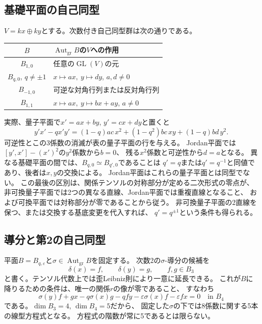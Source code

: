 \documentclass[11pt,a4paper]{ltjsarticle}
\theoremstyle{definition}
\newcommand{\Aut}{\operatorname{Aut}}
\newcommand{\GL}{\operatorname{GL}}
\begin{document}
\subsection{基礎平面の自己同型}
$V=kx\oplus ky$とする。次数付き自己同型群は次の通りである。
\begin{center}
\begin{tabular}{c|p{.65\linewidth}}
\toprule
$B$ & $\Aut_{\mathrm{gr}}B$の$V$への作用\\
\midrule
$B_{1,0}$ & 任意の$\GL(V)$の元\\
$B_{q,0}$, $q\ne\pm1$ & $x\mapsto ax,\ y\mapsto dy$, $a,d\ne0$\\
$B_{-1,0}$ & 可逆な対角行列または反対角行列\\
$B_{1,1}$ & $x\mapsto ax,\ y\mapsto bx+ay$, $a\ne0$\\
\bottomrule
\end{tabular}
\end{center}
実際、量子平面で$x'=ax+by$, $y'=cx+dy$と置くと
\[
y'x'-qx'y'=(1-q)ac\,x^2+(1-q^2)bc\,xy+(1-q)bd\,y^2.
\]
可逆性とこの3係数の消滅が表の量子平面の行を与える。
Jordan平面では$[y',x']-(x')^2$の$y^2$係数から$b=0$、
残る$x^2$係数と可逆性から$d=a$となる。
異なる基礎平面の間では、$B_{q,0}\simeq B_{q',0}$であることは
$q'=q$または$q'=q^{-1}$と同値であり、後者は$x,y$の交換による。
Jordan平面はこれらの量子平面とは同型でない。
この最後の区別は、関係テンソルの対称部分が定める二次形式の零点が、
非可換量子平面では2つの異なる直線、Jordan平面では重複直線となること、
および可換平面では対称部分が零であることから従う。
非可換量子平面の2直線を保つ、または交換する基底変更を代入すれば、
$q'=q^{\pm1}$という条件も得られる。

\subsection{導分と第2の自己同型}
平面$B=B_{q,\varepsilon}$と$\sigma\in\Aut_{\mathrm{gr}}B$を固定する。
次数2の$\sigma$-導分の候補を
\[
\delta(x)=f,\qquad \delta(y)=g,\qquad f,g\in B_3
\]
と書く。テンソル代数上では歪Leibniz則により一意に延長できる。
これが$B$に降りるための条件は、唯一の関係$r$の像が零であること、
すなわち
\begin{equation}\label{spec:eq:delta-condition}
\sigma(y)f+gx-q\sigma(x)g-qfy
-\varepsilon\sigma(x)f-\varepsilon fx=0\quad\text{in }B_4
\end{equation}
である。$\dim B_3=4$, $\dim B_4=5$だから、
固定した$\sigma$の下では8係数に関する5本の線型方程式となる。
方程式の階数が常に5であるとは限らない。
\end{document}
